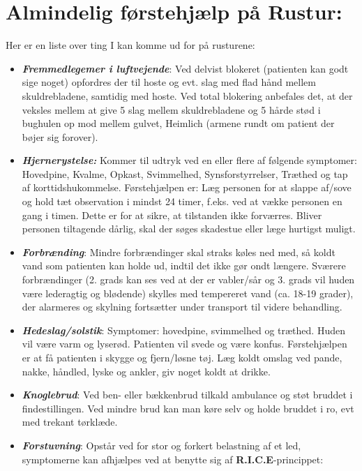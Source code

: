 \section*{Almindelig førstehjælp på Rustur:} Her er en liste over ting I kan komme ud for på rusturene:

\begin{itemize}
\item \textit{\textbf{Fremmedlegemer i luftvejende}}: Ved delvist blokeret (patienten kan godt sige noget) opfordres der til hoste og evt. slag med flad hånd mellem skuldrebladene, samtidig med hoste. Ved total blokering anbefales det, at der veksles mellem at give 5 slag mellem skuldrebladene og 5 hårde stød i bughulen op mod mellem gulvet, Heimlich (armene rundt om patient der bøjer sig forover).\\
\item \textbf{\textit{Hjernerystelse:}} Kommer til udtryk ved en eller flere af følgende symptomer: Hovedpine, Kvalme, Opkast, Svimmelhed, Synsforstyrrelser, Træthed og tap af korttidshukommelse. Førstehjælpen er: Læg personen for at slappe af/sove og hold tæt observation i mindst 24 timer, f.eks. ved at vække personen en gang i timen. Dette er for at sikre, at tilstanden ikke forværres. Bliver personen tiltagende dårlig, skal der søges skadestue eller læge hurtigst muligt. \\
\item \textbf{\textit{Forbrænding}}: Mindre forbrændinger skal straks køles ned med, så koldt vand som patienten kan holde ud, indtil det ikke gør ondt længere. Sværere forbrændinger (2. grads kan ses ved at der er vabler/sår og 3. grads vil huden være lederagtig og blødende) skylles med tempereret vand (ca. 18-19 grader), der alarmeres og skylning fortsætter under transport til videre behandling. \\
\item \textbf{\textit{Hedeslag/solstik}}: Symptomer: hovedpine, svimmelhed og træthed. Huden vil være varm og lyserød. Patienten vil svede og være konfus. Førstehjælpen er at få patienten i skygge og fjern/løsne tøj. Læg koldt omslag ved pande, nakke, håndled, lyske og ankler, giv noget koldt at drikke. \\
\item \textbf{\textit{Knoglebrud}}: Ved ben- eller bækkenbrud tilkald ambulance og støt bruddet i findestillingen. Ved mindre brud kan man køre selv og holde bruddet i ro, evt med trekant tørklæde. \\
\item \textbf{\textit{Forstuvning}}: Opstår ved for stor og forkert belastning af et led, symptomerne kan afhjælpes ved at benytte sig af {\color{red}\textbf{R.I.C.E}}-princippet:

\end{itemize}

